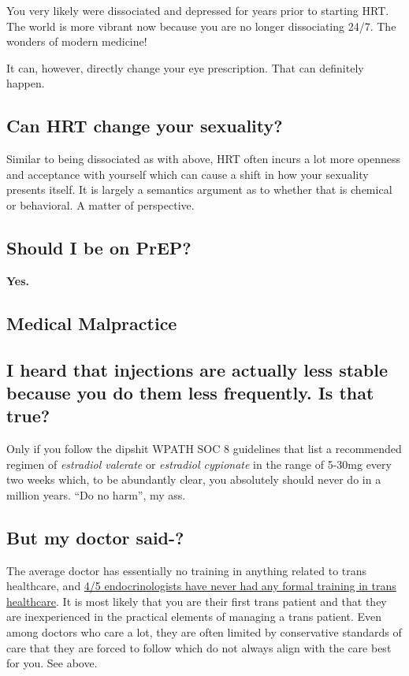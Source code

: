\documentclass{article}
\begin{document}
You very likely were dissociated and depressed for years prior to starting HRT. The world is more vibrant now because you are no longer dissociating 24/7. The wonders of modern medicine!

It can, however, directly change your eye prescription. That can definitely happen.

\subsection{Can HRT change your sexuality?}

Similar to being dissociated as with above, HRT often incurs a lot more openness and acceptance with yourself which can cause a shift in how your sexuality presents itself. It is largely a semantics argument as to whether that is chemical or behavioral. A matter of perspective. 

\subsection{Should I be on PrEP?}

\textbf{Yes.}

\subsection*{Medical Malpractice}

\subsection{I heard that injections are actually less stable because you do them less frequently. Is that true?}

Only if you follow the dipshit WPATH SOC 8 guidelines that list a recommended regimen of \textit{estradiol valerate} or \textit{estradiol cypionate} in the range of 5-30mg every two weeks which, to be abundantly clear, you absolutely should never do in a million years. “Do no harm”, my ass. 

\subsection{But my doctor said-?}

The average doctor has essentially no training in anything related to trans healthcare, and \href{https://www.endocrine.org/news-and-advocacy/news-room/2017/endocrinologists-want-training-in-transgender-care }{4/5 endocrinologists have never had any formal training in trans healthcare}. It is most likely that you are their first trans patient and that they are inexperienced in the practical elements of managing a trans patient. Even among doctors who care a lot, they are often limited by conservative standards of care that they are forced to follow which do not always align with the care best for you. See above.
\end{document}
